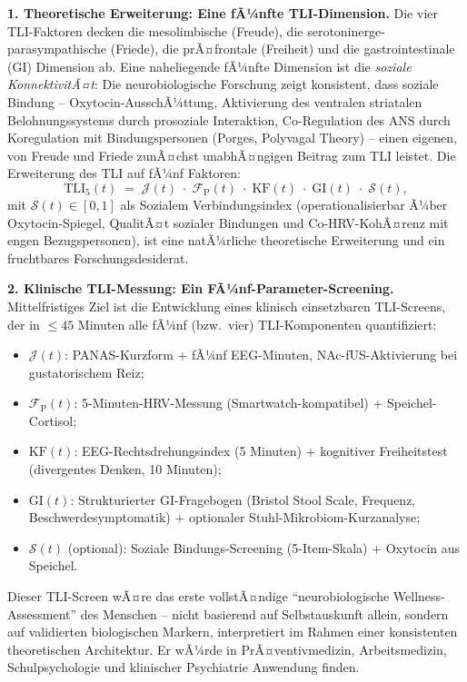 ﻿\documentclass[12pt,a4paper]{report}
\theoremstyle{plain}
\theoremstyle{definition}
\theoremstyle{remark}
\begin{document}
	\textbf{1. Theoretische Erweiterung: Eine fÃ¼nfte TLI-Dimension.}
	Die vier TLI-Faktoren decken die mesolimbische (Freude),
	die serotoninerge-parasympathische (Friede), die prÃ¤\-frontale (Freiheit)
	und die gastrointestinale (GI) Dimension ab.
	Eine naheliegende fÃ¼nfte Dimension ist die \emph{soziale KonnektivitÃ¤t}:
	Die neurobiologische Forschung zeigt konsistent, dass soziale Bindung
	-- Oxytocin-AusschÃ¼ttung, Aktivierung des ventralen striatalen
	Belohnungssystems durch prosoziale Interaktion, Co-Regulation
	des ANS durch Koregulation mit Bindungspersonen (Porges, Polyvagal
	Theory) -- einen eigenen, von Freude und Friede zunÃ¤chst unabhÃ¤ngigen
	Beitrag zum TLI leistet.
	Die Erweiterung des TLI auf fÃ¼nf Faktoren:
	\[
	\mathrm{TLI}_5(t)
	\;=\;
	\mathcal{J}(t)\;\cdot\;\mathcal{F}_{\mathrm{P}}(t)
	\;\cdot\;\mathrm{KF}(t)\;\cdot\;\mathrm{GI}(t)
	\;\cdot\;\mathcal{S}(t),
	\]
	mit $\mathcal{S}(t) \in [0,1]$ als Sozialem Verbindungsindex
	(operationalisierbar Ã¼ber Oxytocin-Spiegel, QualitÃ¤t sozialer
	Bindungen und Co-HRV-KohÃ¤renz mit engen Bezugspersonen),
	ist eine natÃ¼rliche theoretische Erweiterung und ein fruchtbares
	Forschungsdesiderat.

	\textbf{2. Klinische TLI-Messung: Ein FÃ¼nf-Parameter-Screening.}
	Mittelfristiges Ziel ist die Entwicklung eines klinisch
	einsetzbaren TLI-Screens, der in $\leq 45$ Minuten alle
	fÃ¼nf (bzw.\ vier) TLI-Komponenten quantifiziert:
	\begin{itemize}
		\item $\mathcal{J}(t)$: PANAS-Kurzform + fÃ¼nf EEG-Minuten,
		NAc-fUS-Aktivierung bei gustatorischem Reiz;
		\item $\mathcal{F}_{\mathrm{P}}(t)$: 5-Minuten-HRV-Messung
		(Smartwatch-kompatibel) + Speichel-Cortisol;
		\item $\mathrm{KF}(t)$: EEG-Rechtsdrehungsindex (5 Minuten)
		+ kognitiver Freiheitstest (divergentes Denken, 10 Minuten);
		\item $\mathrm{GI}(t)$: Strukturierter GI-Fragebogen
		(Bristol Stool Scale, Frequenz, Beschwerdesymptomatik) +
		optionaler Stuhl-Mikrobiom-Kurzanalyse;
		\item $\mathcal{S}(t)$ (optional): Soziale Bindungs-Screening
		(5-Item-Skala) + Oxytocin aus Speichel.
	\end{itemize}
	Dieser TLI-Screen wÃ¤re das erste vollstÃ¤ndige
	``neurobiologische Wellness-Assessment'' des Menschen --
	nicht basierend auf Selbstauskunft allein, sondern auf
	validierten biologischen Markern, interpretiert im Rahmen
	einer konsistenten theoretischen Architektur.
	Er wÃ¼rde in PrÃ¤ventivmedizin, Arbeitsmedizin, Schulpsychologie
	und klinischer Psychiatrie Anwendung finden.
\end{document}
